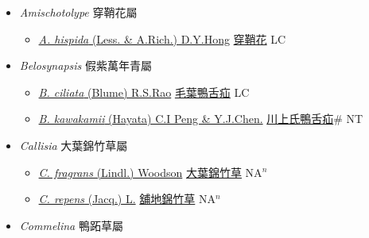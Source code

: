 
  \begin{itemize}
 \item[] \textit{Amischotolype} 穿鞘花屬
                    
  \begin{itemize}
        \item[] \href{http://www.theplantlist.org/tpl1.1/search?q=Amischotolype+hispida}{\textit{A. hispida} (Less. \& A.Rich.) D.Y.Hong}   \href{\detokenize{http://taibnet.sinica.edu.tw/chi/taibnet_species_list.php?T2=穿鞘花&T2_new_value=true&fr=y}}{穿鞘花} LC
  \end{itemize}
 \item[] \textit{Belosynapsis} 假紫萬年青屬
                    
  \begin{itemize}
        \item[] \href{http://www.theplantlist.org/tpl1.1/search?q=Belosynapsis+ciliata}{\textit{B. ciliata} (Blume) R.S.Rao}   \href{\detokenize{http://taibnet.sinica.edu.tw/chi/taibnet_species_list.php?T2=毛葉鴨舌疝&T2_new_value=true&fr=y}}{毛葉鴨舌疝} LC
        \item[] \href{http://www.theplantlist.org/tpl1.1/search?q=Belosynapsis+kawakamii}{\textit{B. kawakamii} (Hayata) C.I Peng \& Y.J.Chen.}   \href{\detokenize{http://taibnet.sinica.edu.tw/chi/taibnet_species_list.php?T2=川上氏鴨舌疝&T2_new_value=true&fr=y}}{川上氏鴨舌疝}\# NT
  \end{itemize}
 \item[] \textit{Callisia} 大葉錦竹草屬
                    
  \begin{itemize}
        \item[] \href{http://www.theplantlist.org/tpl1.1/search?q=Callisia+fragrans}{\textit{C. fragrans} (Lindl.) Woodson}   \href{\detokenize{http://taibnet.sinica.edu.tw/chi/taibnet_species_list.php?T2=大葉錦竹草&T2_new_value=true&fr=y}}{大葉錦竹草} NA$^n$
        \item[] \href{http://www.theplantlist.org/tpl1.1/search?q=Callisia+repens}{\textit{C. repens} (Jacq.) L.}   \href{\detokenize{http://taibnet.sinica.edu.tw/chi/taibnet_species_list.php?T2=舖地錦竹草&T2_new_value=true&fr=y}}{舖地錦竹草} NA$^n$
  \end{itemize}
 \item[] \textit{Commelina} 鴨跖草屬
                    

\end{itemize}
